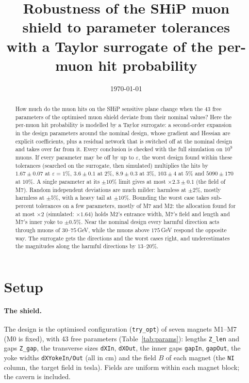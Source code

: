 \documentclass[11pt,a4paper]{article}
\title{Robustness of the SHiP muon shield to parameter tolerances\\[0.3ex]
\large with a Taylor surrogate of the per-muon hit probability}
\author{}
\date{\today}
\begin{document}
\maketitle

\begin{abstract}
How much do the muon hits on the SHiP sensitive plane change when the 43 free parameters of the
optimised muon shield deviate from their nominal values? Here the per-muon hit probability is
modelled by a Taylor surrogate: a second-order expansion in the design parameters around the
nominal design, whose gradient and Hessian are explicit coefficients, plus a residual network
that is switched off at the nominal design and takes over far from it. Every conclusion is
checked with the full simulation on $10^9$ muons. If every parameter may be off by up to
$\varepsilon$, the worst design found within these tolerances (searched on the surrogate, then
simulated) multiplies the hits by $1.67\pm0.07$ at $\varepsilon=1\%$, $3.6\pm0.1$ at $2\%$,
$8.9\pm0.3$ at $3\%$, $103\pm4$ at $5\%$ and $5090\pm170$ at $10\%$. A single parameter at its
$\pm10\%$ limit gives at most $\times2.3\pm0.1$ (the field of M7). Random independent deviations
are much milder: harmless at $\pm2\%$, mostly harmless at $\pm5\%$, with a heavy tail at
$\pm10\%$. Bounding the worst case takes sub-percent tolerances on a few parameters, mostly of
M7 and M2: the allocation found for at most $\times2$ (simulated: $\times1.64$) holds M2's entrance
width, M7's field and length and M7's inner yoke to $\pm0.5\%$. Near the nominal design every
harmful direction acts through muons of $30$--$75$\,GeV, while the muons above $175$\,GeV respond
the opposite way. The surrogate gets the directions and the worst cases right, and
underestimates the magnitudes along the harmful directions by $13$--$20\%$.
\end{abstract}

\tableofcontents

\section{Setup}

\paragraph{The shield.}
The design is the optimised configuration (\texttt{try\_opt}) of seven magnets M1--M7 (M0 is
fixed), with 43 free parameters (Table~\ref{tab:params}): lengths \texttt{Z\_len} and gaps
\texttt{Z\_gap}, the transverse sizes \texttt{dXIn}, \texttt{dXOut}, the inner gaps
\texttt{gapIn}, \texttt{gapOut}, the yoke widths \texttt{dXYokeIn/Out} (all in cm) and the field
$B$ of each magnet (the \texttt{NI} column, the target field in tesla). Fields are uniform within
each magnet block; the cavern is included.
\end{document}
